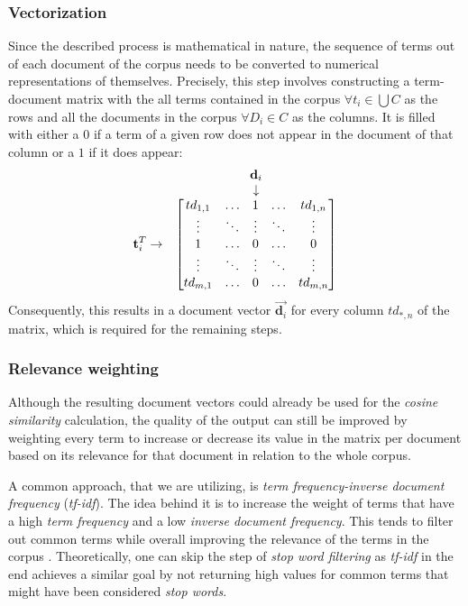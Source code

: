 \documentclass[12pt,a4paper]{report}
\begin{document}
\subsubsection{Vectorization}
Since the described process is mathematical in nature,
the sequence of terms out of each document of the corpus needs to be
converted to numerical representations of themselves. Precisely, this step
involves constructing a term-document matrix with the all terms contained in
the corpus \(\forall t_i \in \bigcup C\) as the rows and all the documents in
the corpus \(\forall D_i \in C\) as the columns. It is filled with either a
\(0\) if a term of a given row does not appear in the document of that column or
a \(1\) if it does appear:
\[
  \begin{matrix}
    & \textbf d_i \\
    & \downarrow \\
    \textbf t_i^{T} \rightarrow &
    \begin{bmatrix}
      td_{1,1}  & \dots   & 1       & \dots   & td_{1,n}  \\
      \vdots    & \ddots  & \vdots  & \ddots  & \vdots    \\
      1         & \dots   & 0       & \dots   & 0         \\
      \vdots    & \ddots  & \vdots  & \ddots  & \vdots    \\
      td_{m,1}  & \dots   & 0       & \dots   & td_{m,n}  \\
    \end{bmatrix}
  \end{matrix}
\]
Consequently, this results in a document vector \(\vec{\mathbf d_i}\)
for every column \(td_{*,n}\) of the matrix, which is required for the remaining steps.


\subsubsection{Relevance weighting}
Although the resulting document vectors
could already be used for the \textit{cosine similarity} calculation, the
quality of the output can still be improved by weighting every term to increase
or decrease its value in the matrix per document based on its relevance for
that document in relation to the whole corpus.

A common approach, that we are utilizing, is \textit{term frequency-inverse
document frequency} (\textit{tf-idf}). The idea behind it is to increase the
weight of terms that have a high \textit{term frequency} and a low \textit{
inverse document frequency}. This tends to filter out common terms while
overall improving the relevance of the terms in the corpus \cite{
robertson2004tfidf, singhal2001ir}. Theoretically, one can skip the step of
\textit{stop word filtering} as \textit{tf-idf} in the end achieves a similar
goal by not returning high values for common terms that might have been
considered \textit{stop words}.
\end{document}

